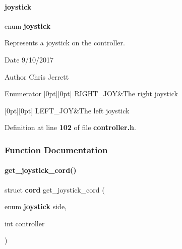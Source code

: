 \mbox{\label{controller_8h_ac365c9e892abe4a1b85ae8f56a4eae5a}} 
\paragraph{joystick}
{\footnotesize\ttfamily enum \textbf{ joystick}}



Represents a joystick on the controller. 

\begin{DoxyDate}{Date}
9/10/2017 
\end{DoxyDate}
\begin{DoxyAuthor}{Author}
Chris Jerrett 
\end{DoxyAuthor}
\begin{DoxyEnumFields}{Enumerator}
[0pt][0pt]{}\mbox{\label{controller_8h_ac365c9e892abe4a1b85ae8f56a4eae5aae08a2d362c677f96f72d93047513cafe}} 
R\+I\+G\+H\+T\+\_\+\+J\+OY&The right joystick \\
\hline

[0pt][0pt]{}\mbox{\label{controller_8h_ac365c9e892abe4a1b85ae8f56a4eae5aaf822d7888862e67a3c624775b85c50a9}} 
L\+E\+F\+T\+\_\+\+J\+OY&The left joystick \\
\hline

\end{DoxyEnumFields}


Definition at line \textbf{ 102} of file \textbf{ controller.\+h}.



\subsubsection{Function Documentation}
\mbox{\label{controller_8h_a0ce0176099c0bb15ad8c36123222059d}} 
\paragraph{get\+\_\+joystick\+\_\+cord()}
{\footnotesize\ttfamily struct \textbf{ cord} get\+\_\+joystick\+\_\+cord (\begin{DoxyParamCaption}\item[{enum \textbf{ joystick}}]{side,  }\item[{int}]{controller }\end{DoxyParamCaption})}



